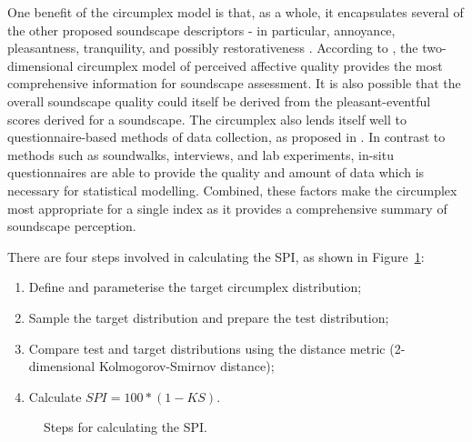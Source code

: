 \documentclass[
  authoryear,
  preprint,
  3p]{elsarticle}
\providecommand{\tightlist}{%
  \setlength{\itemsep}{0pt}\setlength{\parskip}{0pt}}\usepackage{longtable,booktabs,array}
\begin{document}
One benefit of the circumplex model is that, as a whole, it encapsulates
several of the other proposed soundscape descriptors - in particular,
annoyance, pleasantness, tranquility, and possibly restorativeness
\citep{Aletta2016Soundscape}. According to \citet{Axelsson2015How}, the
two-dimensional circumplex model of perceived affective quality provides
the most comprehensive information for soundscape assessment. It is also
possible that the overall soundscape quality could itself be derived
from the pleasant-eventful scores derived for a soundscape. The
circumplex also lends itself well to questionnaire-based methods of data
collection, as proposed in \citet{ISO12913Part2}. In contrast to methods
such as soundwalks, interviews, and lab experiments, in-situ
questionnaires are able to provide the quality and amount of data which
is necessary for statistical modelling. Combined, these factors make the
circumplex most appropriate for a single index as it provides a
comprehensive summary of soundscape perception.

There are four steps involved in calculating the SPI, as shown in
Figure~\ref{fig-bespoke-spi}:

\begin{enumerate}
\def\labelenumi{\arabic{enumi}.}
\tightlist
\item
  Define and parameterise the target circumplex distribution;
\item
  Sample the target distribution and prepare the test distribution;
\item
  Compare test and target distributions using the distance metric
  (2-dimensional Kolmogorov-Smirnov distance);
\item
  Calculate \(SPI = 100 * (1 - KS)\).
\end{enumerate}

\begin{figure}


\caption{\label{fig-bespoke-spi}Steps for calculating the SPI.}

\end{figure}%
\end{document}
